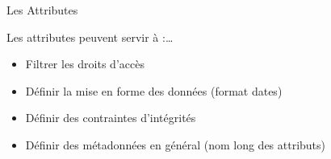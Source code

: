 \begin{frame}{Les Attributes}

  Les attributes peuvent servir à :\dots
  \begin{itemize}
  \item Filtrer les droits d'accès
  \item Définir la mise en forme des données (format dates)
\item Définir des contraintes d'intégrités
\item Définir des métadonnées en général (nom long des attributs)
  \end{itemize}
\end{frame}
